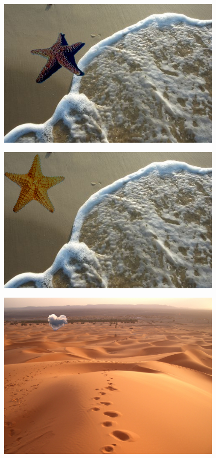 \documentclass[oneside]{article}
\begin{document}
\begin{figure}[htbp]
\centering
\includegraphics[width=1\textwidth]{./img/mix_dest_water_estrella.jpg}
\caption{}
\label{fig:4}
\end{figure}

\begin{figure}[htbp]
\centering
\includegraphics[width=.5\textwidth]{./img/mix_Mixing_starSea.png}
\caption{}
\label{fig:5}
\end{figure}


\begin{figure}[htbp]
\centering
\includegraphics[width=1\textwidth]{./img/mix_dest_desert_nube.jpg}
\caption{}
\label{fig:6}
\end{figure}
\end{document}
